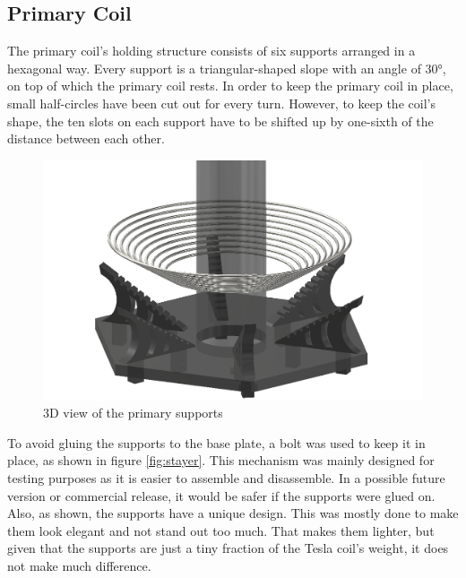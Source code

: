 \subsection{Primary Coil}

The primary coil's holding structure consists of six supports arranged in a hexagonal way. Every support is a triangular-shaped slope with an angle of 30°, on top of which the primary coil rests. In order to keep the primary coil in place, small half-circles have been cut out for every turn. However, to keep the coil's shape, the ten slots on each support have to be shifted up by one-sixth of the distance between each other.

\begin{figure}[h!]
    \centering
    \includegraphics[width=1\textwidth]{kassandra/resources/endeMeinerHoffnung.png}
    \caption{3D view of the primary supports}
    \label{fig:primary-supports}
\end{figure}

To avoid gluing the supports to the base plate, a bolt was used to keep it in place, as shown in figure \ref{fig:stayer}. This mechanism was mainly designed for testing purposes as it is easier to assemble and disassemble. In a possible future version or commercial release, it would be safer if the supports were glued on. Also, as shown, the supports have a unique design. This was mostly done to make them look elegant and not stand out too much. That makes them lighter, but given that the supports are just a tiny fraction of the Tesla coil's weight, it does not make much difference.

